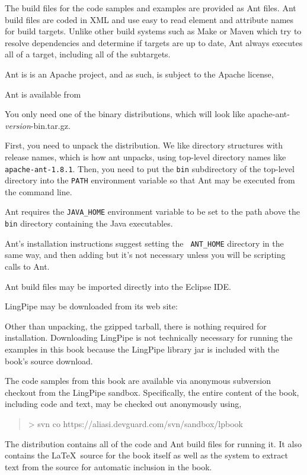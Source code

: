 
\noindent
The build files for the code samples and examples are provided as Ant
files.  Ant build files are coded in XML and use easy to read element
and attribute names for build targets.  Unlike other build systems
such as Make or Maven which try to resolve dependencies and determine
if targets are up to date, Ant always executes all of a target,
including all of the subtargets.

Ant is is an Apache project, and as such, is subject to the Apache license,
\begin{quote}
\end{quote}
%
Ant is available from 
%
\begin{quote}
\end{quote}
%
You only need one of the binary distributions, which will
look like {\ttfamily apache-ant-{\it\ttfamily version}-bin.tar.gz}.

First, you need to unpack the distribution.  We like directory
structures with release names, which is how ant unpacks, using
top-level directory names like {\tt apache-ant-1.8.1}.  Then, you need
to put the {\tt bin} subdirectory of the top-level directory into the
{\tt PATH} environment variable so that Ant may be executed from the
command line.

Ant requires the {\tt JAVA\_HOME} environment variable to be set to
the path above the {\tt bin} directory containing the Java
executables.  

Ant's installation instructions suggest setting the {\tt
ANT\_HOME} directory in the same way, and then adding but it's not necessary unless
you will be scripting calls to Ant.

Ant build files may be imported directly into the Eclipse IDE.


\noindent
LingPipe may be downloaded from its web site:
%
\begin{quote}
\end{quote}
%
Other than unpacking, the gzipped tarball, there is nothing required
for installation.  Downloading LingPipe is not technically necessary for
running the examples in this book because the LingPipe library jar is
included with the book's source download.



\noindent
The code samples from this book are available via anonymous subversion checkout
from the LingPipe sandbox.  Specifically, the entire content of the book,
including code and text, may be checked out anonymously using,

\begin{quote}
{\small\ttfamily
> svn co https://aliasi.devguard.com/svn/sandbox/lpbook
}
\end{quote}
%
The distribution contains all of the code and Ant build files for
running it.  It also contains the \LaTeX\ source for the book itself
as well as the system to extract text from the source for automatic
inclusion in the book.
